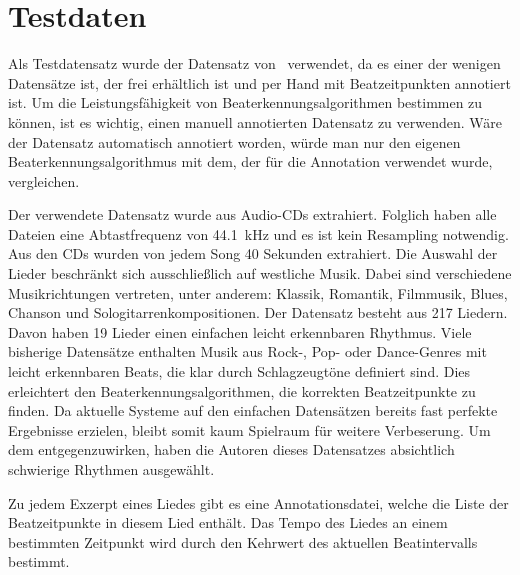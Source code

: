 \section{Testdaten} \label{konzept/testdaten}
{
	Als Testdatensatz wurde der Datensatz von~\cite{2012_HoDaZaOlGo} verwendet,
		da es einer der wenigen Datensätze ist,
		der frei erhältlich ist
		und per Hand mit Beatzeitpunkten annotiert ist.
	Um die Leistungsfähigkeit von Beaterkennungsalgorithmen bestimmen zu können,
		ist es wichtig,
		einen manuell annotierten Datensatz zu verwenden.
	Wäre der Datensatz automatisch annotiert worden,
		würde man nur den eigenen Beaterkennungsalgorithmus mit dem,
		der für die Annotation verwendet wurde,
		vergleichen.

	Der verwendete Datensatz wurde aus Audio-CDs extrahiert.
	Folglich haben alle Dateien eine Abtastfrequenz von \SI{44.1}{\kilo\hertz}
		und es ist kein Resampling notwendig.
	Aus den CDs wurden von jedem Song \num{40} Sekunden extrahiert.
	Die Auswahl der Lieder beschränkt sich ausschlie{\ss}lich auf westliche Musik.
	Dabei sind verschiedene Musikrichtungen vertreten,
		unter anderem: Klassik, Romantik, Filmmusik, Blues, Chanson und Sologitarrenkompositionen.
	Der Datensatz besteht aus 217 Liedern.
	Davon haben 19 Lieder einen einfachen leicht erkennbaren Rhythmus.
	Viele bisherige Datensätze enthalten Musik aus Rock-, Pop- oder Dance-Genres
		mit leicht erkennbaren Beats,
		die klar durch Schlagzeugtöne definiert sind.
	Dies erleichtert den Beaterkennungsalgorithmen,
		die korrekten Beatzeitpunkte zu finden.
	Da aktuelle Systeme auf den einfachen Datensätzen bereits fast perfekte Ergebnisse erzielen,
		bleibt somit kaum Spielraum für weitere Verbeserung.
	Um dem entgegenzuwirken,
		haben die Autoren dieses Datensatzes absichtlich schwierige Rhythmen ausgewählt.

	Zu jedem Exzerpt eines Liedes gibt es eine Annotationsdatei,
		welche die Liste der Beatzeitpunkte in diesem Lied enthält.
	Das Tempo des Liedes an einem bestimmten Zeitpunkt wird durch den Kehrwert des aktuellen Beatintervalls bestimmt.
}

